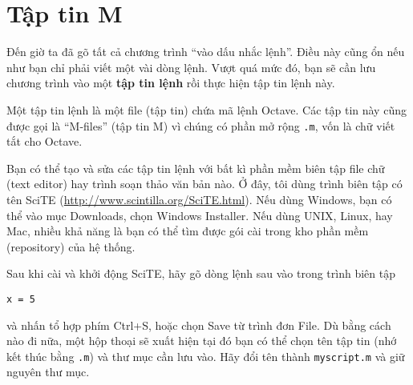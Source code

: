 \documentclass[12pt]{book}
\begin{document}
\section{Tập tin M}

Đến giờ ta đã gõ tất cả chương trình ``vào dấu nhắc lệnh''. Điều này
cũng ổn nếu như bạn chỉ phải viết một vài dòng lệnh. Vượt quá
mức đó, bạn sẽ cần lưu chương trình vào một {\bf tập tin lệnh} rồi
thực hiện tập tin lệnh này.

Một tập tin lệnh là một file (tập tin) chứa mã lệnh Octave. Các tập tin
này cũng được gọi là ``M-files'' (tập tin M) vì chúng có phần mở rộng
{\tt .m}, vốn là chữ viết tắt cho Octave.

Bạn có thể tạo và sửa các tập tin lệnh với bất kì phần mềm biên tập
file chữ (text editor) hay trình soạn thảo văn bản nào.
Ở đây, tôi dùng trình biên tập có tên SciTE (\url{http://www.scintilla.org/SciTE.html}).
Nếu dùng Windows, bạn có thể vào mục Downloads, chọn Windows Installer.
Nếu dùng UNIX, Linux, hay Mac, nhiều khả năng là bạn có thể tìm được
gói cài trong kho phần mềm (repository) của hệ thống.

Sau khi cài và khởi động SciTE, hãy gõ dòng lệnh sau vào trong trình biên tập 

\begin{verbatim}
x = 5
\end{verbatim}
%
và nhấn tổ hợp phím \textsf{Ctrl+S}, hoặc chọn 
{\sf Save} từ trình đơn {\sf File}. Dù bằng cách nào đi nữa, một hộp thoại 
sẽ xuất hiện tại đó bạn có thể chọn tên tập tin (nhớ kết thúc bằng \texttt{.m})
và thư mục cần lưu vào. Hãy đổi tên thành {\tt myscript.m} và giữ nguyên thư mục.
\end{document}
